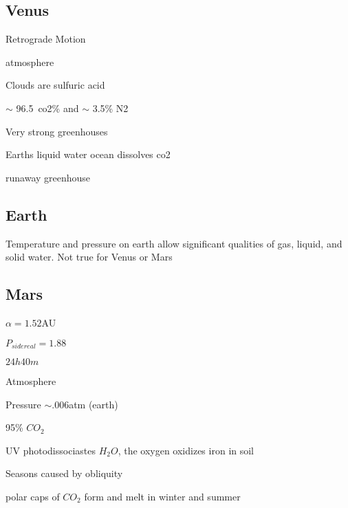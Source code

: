 \documentclass{article}
\begin{document}
\subsection{Venus} 
\begin{list}{-}{}
\item Retrograde Motion
\item atmosphere
\begin{list}{-}{}
\item Clouds are sulfuric acid
\item \(\sim\) 96.5\ co2\% and \(\sim\) 3.5\% N2 
\item Very strong greenhouses
\end{list}
\item Earths liquid water ocean dissolves co2
\item runaway greenhouse
\end{list}

\subsection{Earth}
\begin{list}{-}{}
\item Temperature and pressure on earth allow significant qualities of gas, liquid, and solid water. Not true for Venus or Mars
\end{list}

\subsection{Mars}
\begin{list}{-}{}
\item \(\alpha = 1.52\)AU
\item \(P_{sidereal} = 1.88\)
\item \(24h40m\)
\item Atmosphere
\begin{list}{-}{}
\item Pressure \(\sim .006\)atm (earth)
\item 95\% \(CO_2\)
\item UV photodissociastes \(H_2O\), the oxygen oxidizes iron in soil
\end{list}
\item Seasons caused by obliquity 
\item polar caps of \(CO_2\) form and melt in winter and summer 
\end{list}
\end{document}
